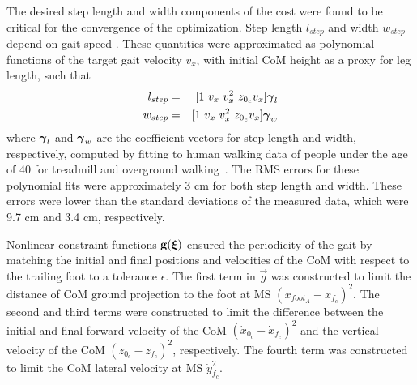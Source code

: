 The desired step length and width components of the cost were found to be critical for the convergence of the optimization. Step length $ l_{step} $ and width $ w_{step} $ depend on gait speed \cite{andriacchi1977walking}. These quantities were approximated as polynomial functions of the target gait velocity $ v_x $, with initial CoM height as a proxy for leg length, such that
\begin{eqnarray}
	l_{step} &=& [1\ v_x\ v_x^2\ z_{0_{c}} v_x] \boldsymbol{\gamma}_l \\
	w_{step} &=& [1\ v_x\ v_x^2\ z_{0_{c}} v_x] \boldsymbol{\gamma}_w
\end{eqnarray}
%
where $ \boldsymbol{\gamma}_l $ and $ \boldsymbol{\gamma}_w $ are the coefficient vectors for step length and width, respectively, computed by fitting to human walking data of people under the age of 40 for treadmill and overground walking~\cite{fukuchi2018public}. The RMS errors for these polynomial fits were approximately 3 cm for both step length and width. These errors were lower than the standard deviations of the measured data, which were 9.7 cm and 3.4 cm, respectively.
%

Nonlinear constraint functions $ \mathbf{g}(\boldsymbol{\xi}) $ ensured the periodicity of the gait by matching the initial and final positions and velocities of the CoM with respect to the trailing foot to a tolerance $ \epsilon $. The first term in $ \vec{g} $ was constructed to limit the distance of CoM ground projection to the foot at MS $ (x_{foot_A} - x_{f_{c}})^2  $. The second and third terms were constructed to limit the difference between the initial and final forward velocity of the CoM $ (\dot{x}_{0_{c}} - \dot{x}_{f_{c}} )^2 $ and the vertical velocity of the CoM $ (z_{0_{c}} - z_{f_{c}})^2 $, respectively. The fourth term was constructed to limit the CoM lateral velocity at MS $ \dot{y}_{f_{c}}^2 $.
%	

